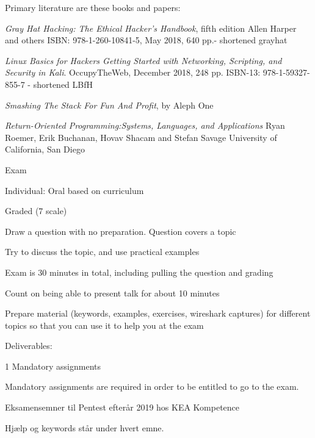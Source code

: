 \documentclass[Screen16to9,17pt]{foils}
\begin{document}

Primary literature are these books and papers:
\begin{list2}
\item \emph{Gray Hat Hacking: The Ethical Hacker's Handbook}, fifth edition
Allen Harper and others
ISBN: 978-1-260-10841-5, May 2018, 640 pp.- shortened grayhat
\item \emph{Linux Basics for Hackers Getting Started with Networking, Scripting, and Security in Kali}. OccupyTheWeb, December 2018, 248 pp. ISBN-13: 978-1-59327-855-7 - shortened LBfH
\item \emph{Smashing The Stack For Fun And Profit}, by Aleph One
\item \emph{Return-Oriented Programming:Systems, Languages, and Applications}
Ryan Roemer, Erik Buchanan, Hovav Shacam and Stefan Savage University of California, San Diego

\end{list2}




\begin{list2}
\item Exam
\item Individual: Oral based on curriculum
\item Graded (7 scale)
\item Draw a question with no preparation. Question covers a topic
\item Try to discuss the topic, and use practical examples
\item Exam is 30 minutes in total, including pulling the question and grading
\item Count on being able to present talk for about 10 minutes
\item Prepare material (keywords, examples, exercises, wireshark captures) for different topics so that you can use it to help you at the exam

\vskip 5mm
\item Deliverables:
\item 1 Mandatory assignments
\item Mandatory assignments are required in order to be entitled to go to the exam.
\end{list2}


Eksamensemner til Pentest efterår 2019 hos KEA Kompetence

Hjælp og keywords står under hvert emne.
\end{document}
